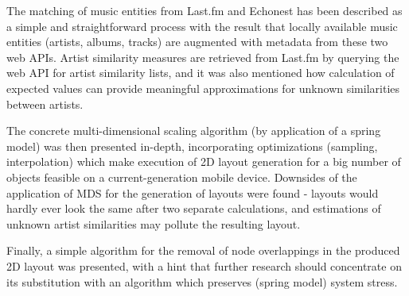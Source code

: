 The matching of music entities from Last.fm and Echonest has been described as a simple and straightforward process with the result that locally available music entities (artists, albums, tracks) are augmented with metadata from these two web APIs. Artist similarity measures are retrieved from Last.fm by querying the web API for artist similarity lists, and it was also mentioned how calculation of expected values can provide meaningful approximations for unknown similarities between artists.

The concrete multi-dimensional scaling algorithm (by application of a spring model) was then presented in-depth, incorporating optimizations (sampling, interpolation) which make execution of 2D layout generation for a big number of objects feasible on a current-generation mobile device. Downsides of the application of MDS for the generation of layouts were found - layouts would hardly ever look the same after two separate calculations, and estimations of unknown artist similarities may pollute the resulting layout. 

Finally, a simple algorithm for the removal of node overlappings in the produced 2D layout was presented, with a hint that further research should concentrate on its substitution with an algorithm which preserves (spring model) system stress.